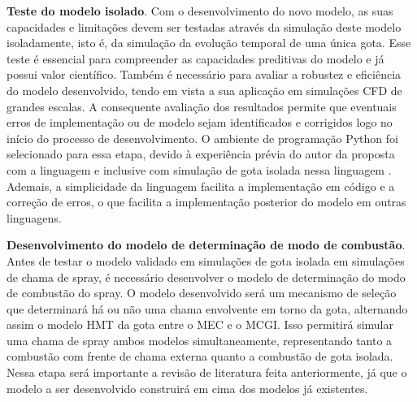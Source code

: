 \textbf{Teste do modelo isolado}.
Com o desenvolvimento do novo modelo, as suas capacidades e limitações devem ser testadas através da simulação deste modelo isoladamente, isto é, da simulação da evolução temporal de uma única gota.
Esse teste é essencial para compreender as capacidades preditivas do modelo e já possui valor científico. Também é necessário para avaliar a robustez e eficiência do modelo desenvolvido, tendo em vista a sua aplicação em simulações CFD de grandes escalas.
A consequente avaliação dos resultados permite que eventuais erros de implementação ou de modelo sejam identificados e corrigidos logo no início do processo de desenvolvimento.
O ambiente de programação Python foi selecionado para essa etapa, devido à experiência prévia do autor da proposta com a linguagem e inclusive com simulação de gota isolada nessa linguagem \cite{HenningsJ2024MT}.
Ademais, a simplicidade da linguagem facilita a implementação em código e a correção de erros, o que facilita a implementação posterior do modelo em outras linguagens.

\textbf{Desenvolvimento do modelo de determinação de modo de combustão}.
Antes de testar o modelo validado em simulações de gota isolada em simulações de chama de spray, é necessário desenvolver o modelo de determinação do modo de combustão do spray.
O modelo desenvolvido será um mecanismo de seleção que determinará há ou não uma chama envolvente em torno da gota, alternando assim o modelo HMT da gota entre o MEC e o MCGI.
Isso permitirá simular uma chama de spray ambos modelos simultaneamente, representando tanto a combustão com frente de chama externa quanto a combustão de gota isolada.
Nessa etapa será importante a revisão de literatura feita anteriormente, já que o modelo a ser desenvolvido construirá em cima dos modelos já existentes.

